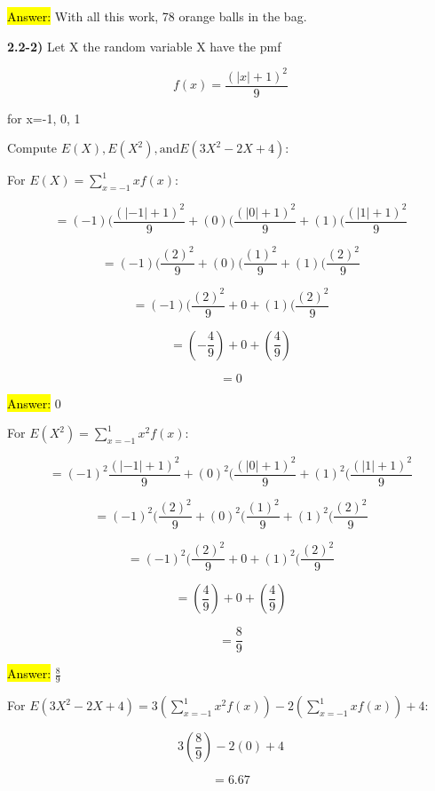 \documentclass{article}
\begin{document}
\hl{Answer:} With all this work, 78 orange balls in the bag.


\vspace{3mm}






\newpage
\textbf{2.2-2)} Let X the random variable X have the pmf


$$f(x)=\frac{(|x|+1)^2}{9}$$

for x=-1, 0, 1

\vspace{2mm}

Compute $E(X), E(X^{2}), \text{and} E(3X^{2}-2X+4)$:

\vspace{2mm}

For $E(X)= \sum^{1}_{x=-1}xf(x)$:

$$=(-1)(\frac{(|-1|+1)^2}{9} + (0)(\frac{(|0|+1)^2}{9} + (1)(\frac{(|1|+1)^2}{9}$$

$$=(-1)(\frac{(2)^2}{9} + (0)(\frac{(1)^2}{9} + (1)(\frac{(2)^2}{9}$$

$$=(-1)(\frac{(2)^2}{9} + 0 + (1)(\frac{(2)^2}{9}$$

$$=(-\frac{4}{9}) + 0 +(\frac{4}{9}) $$

$$=0$$

\hl{Answer:} 0

\vspace{2mm}

For $E(X^{2})= \sum^{1}_{x=-1} x^{2} f(x)$:


$$=(-1)^{2}\frac{(|-1|+1)^2}{9} + (0)^{2}(\frac{(|0|+1)^2}{9} + (1)^{2}(\frac{(|1|+1)^2}{9}$$

$$=(-1)^{2}(\frac{(2)^2}{9} + (0)^{2}(\frac{(1)^2}{9} + (1)^{2}(\frac{(2)^2}{9}$$

$$=(-1)^{2}(\frac{(2)^2}{9} + 0 + (1)^{2}(\frac{(2)^2}{9}$$

$$=(\frac{4}{9}) + 0 +(\frac{4}{9}) $$

$$=\frac{8}{9}$$

\hl{Answer:} $\frac{8}{9}$

\vspace{2mm}

For $E(3X^{2}-2X+4)= 3(\sum^{1}_{x=-1} x^{2} f(x))-2(\sum^{1}_{x=-1}xf(x))+4$:

$$3(\frac{8}{9})-2(0)+4$$

$$=6.67$$
\end{document}

